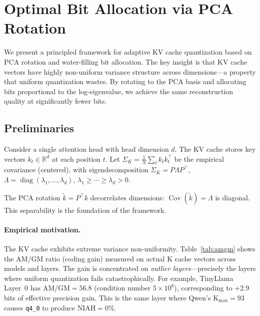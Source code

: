 
\section{Optimal Bit Allocation via PCA Rotation}
\label{sec:pca-theory}

We present a principled framework for adaptive KV cache quantization based on PCA rotation and water-filling bit allocation. The key insight is that KV cache vectors have highly non-uniform variance structure across dimensions---a property that uniform quantization wastes. By rotating to the PCA basis and allocating bits proportional to the log-eigenvalue, we achieve the same reconstruction quality at significantly fewer bits.

\subsection{Preliminaries}

Consider a single attention head with head dimension $d$. The KV cache stores key vectors $k_t \in \mathbb{R}^d$ at each position $t$. Let $\Sigma_K = \frac{1}{N} \sum_t k_t k_t^\top$ be the empirical covariance (centered), with eigendecomposition $\Sigma_K = P \Lambda P^\top$, $\Lambda = \operatorname{diag}(\lambda_1, \ldots, \lambda_d)$, $\lambda_1 \geq \cdots \geq \lambda_d > 0$.

The PCA rotation $\tilde{k} = P^\top k$ decorrelates dimensions: $\operatorname{Cov}(\tilde{k}) = \Lambda$ is diagonal. This separability is the foundation of the framework.

\paragraph{Empirical motivation.}
The KV cache exhibits extreme variance non-uniformity. Table~\ref{tab:amgm} shows the AM/GM ratio (coding gain) measured on actual K cache vectors across models and layers. The gain is concentrated on \emph{outlier layers}---precisely the layers where uniform quantization fails catastrophically. For example, TinyLlama Layer~0 has AM/GM${}= 56.8$ (condition number $5 \times 10^8$), corresponding to $+2.9$ bits of effective precision gain. This is the same layer where Qwen's K$_{\max} = 93$ causes \texttt{q4\_0} to produce NIAH${}= 0\%$.

